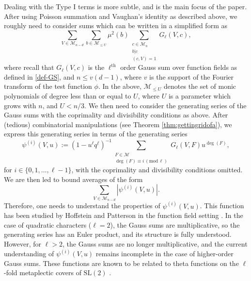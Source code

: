 \documentclass[12pt]{amsart}
\renewcommand{\pmod}[1]{\,(\mathrm{mod}\,#1)}
\begin{document}
Dealing with the Type I terms is more subtle, and is the main focus of the paper. After using Poisson summation and Vaughan's identity as described above, we roughly need to consider sums which can be written in a simplified form as
$$ \sum_{V \in \mathcal{M}_{n-d}} \sum_{b \in \mathcal{M}_{\leq U}} \mu^2(b) \sum_{\substack{c \in \mathcal{M}_n \\ b|c \\ (c,V)=1}} G_{\ell}(V,c),$$ where recall that $G_{\ell}(V,c)$ is the $\ell^{\text{th}}$ order Gauss sum over function fields as defined in \eqref{def-GS}, and $n \leq v(d-1)$, where $v$ is the support of the Fourier transform of the test function $\phi$. In the above, $\mathcal{M}_{\leq U}$ denotes the set of monic polynomials of degree less than or equal to $U$, where $U$ is a parameter which grows with $n$, and $U<n/3$.
We then need to consider the generating series of the Gauss sums with the coprimality and divisibility conditions as above. After (tedious) combinatorial manipulations (see Theorem \ref{thm:gettingridofa}), we express this generating series in terms of the generating series
\[
 \psi^{(i)}(V, u)  := (1-u^{\ell}  q^{\ell})^{-1}\sum_{\substack{F \in \mathcal{M}\\ \deg(F) \equiv i \pmod{\ell} }} G_\ell(V, F) u^{\deg(F)},\]
for $i \in \{0,1,\ldots, \ell-1\}$, with the coprimality and divisibility conditions omitted. We are then led to bound averages of the form
 \begin{equation} 
\label{sumv2}\sum_{V \in \mathcal{M}_{n-d}} | \psi^{(i)}(V,u)|.\end{equation}
Therefore, one needs to understand the properties of $\psi^{(i)}(V,u)$. This function has been studied by Hoffstein and Patterson in the function field setting \cite{patterson, hoffstein}. In the case of quadratic characters ($\ell=2$), the Gauss sums are multiplicative, so the generating series has an Euler product, and its structure is fully understood. However, for $\ell>2$, the Gauss sums are no longer multiplicative, and the current understanding of $\psi^{(i)}(V,u)$ remains incomplete in the case of higher-order Gauss sums. These functions are known to be related to theta functions on the $\ell$-fold metaplectic covers of $\text{SL}(2)$ \cite{hoffstein}.
\end{document}
